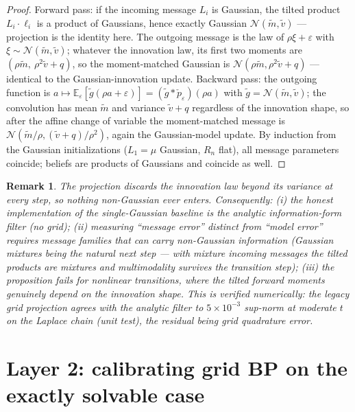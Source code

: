 \documentclass[11pt]{article}
\newtheorem{remark}{Remark}
\newcommand{\E}{\mathbb{E}}
\newcommand{\Normal}{\mathcal{N}}
\begin{document}
\begin{proof}
Forward pass: if the incoming message $L_i$ is Gaussian, the tilted product
$L_i\cdot\ell_i$ is a product of Gaussians, hence exactly Gaussian
$\Normal(\tilde m,\tilde v)$ --- projection is the identity here. The outgoing message
is the law of $\rho\xi+\varepsilon$ with $\xi\sim\Normal(\tilde m,\tilde v)$; whatever
the innovation law, its first two moments are $(\rho\tilde m,\ \rho^2\tilde v+q)$, so
the moment-matched Gaussian is $\Normal(\rho\tilde m,\rho^2\tilde v+q)$ --- identical
to the Gaussian-innovation update. Backward pass: the outgoing function is
$a\mapsto\E_\varepsilon[\tilde g(\rho a+\varepsilon)]=(\tilde g*\check p_\varepsilon)(\rho a)$
with $\tilde g=\Normal(\tilde m,\tilde v)$; the convolution has mean $\tilde m$ and
variance $\tilde v+q$ regardless of the innovation shape, so after the affine change of
variable the moment-matched message is $\Normal(\tilde m/\rho,(\tilde v+q)/\rho^2)$,
again the Gaussian-model update. By induction from the Gaussian initializations
($L_1=\mu$ Gaussian, $R_n$ flat), all message parameters coincide; beliefs are products
of Gaussians and coincide as well.
\end{proof}

\begin{remark}
The projection discards the innovation law beyond its variance \emph{at every step},
so nothing non-Gaussian ever enters. Consequently: (i) the honest implementation of
the single-Gaussian baseline is the analytic information-form filter (no grid);
(ii) measuring ``message error'' distinct from ``model error'' requires message
families that can carry non-Gaussian information (Gaussian mixtures being the natural
next step --- with mixture incoming messages the tilted products are mixtures and
multimodality survives the transition step); (iii) the proposition fails for
\emph{nonlinear} transitions, where the tilted forward moments genuinely depend on the
innovation shape. This is verified numerically: the legacy grid projection agrees with
the analytic filter to $5\times10^{-3}$ sup-norm at moderate $t$ on the Laplace chain
(unit test), the residual being grid quadrature error.
\end{remark}

\section{Layer 2: calibrating grid BP on the exactly solvable case}
\end{document}
